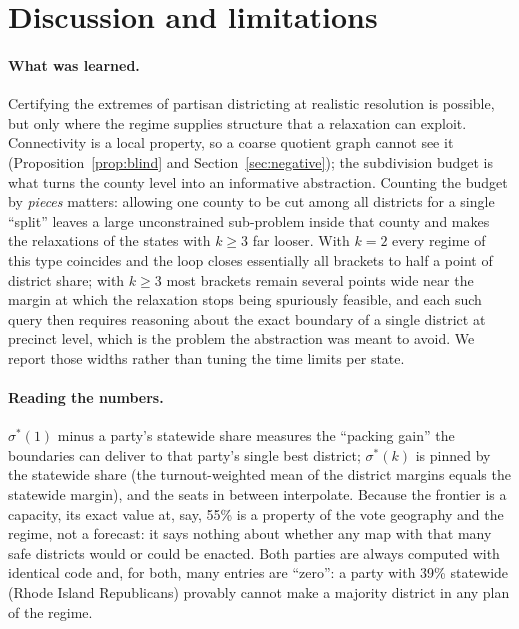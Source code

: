 \section{Discussion and limitations}\label{sec:disc}

\paragraph{What was learned.}
Certifying the extremes of partisan districting at realistic resolution is possible, but only where the regime supplies structure that a relaxation can exploit. Connectivity is a local property, so a coarse quotient graph cannot see it (Proposition~\ref{prop:blind} and Section~\ref{sec:negative}); the subdivision budget is what turns the county level into an informative abstraction. Counting the budget by \emph{pieces} matters: allowing one county to be cut among all districts for a single ``split'' leaves a large unconstrained sub-problem inside that county and makes the relaxations of the states with $k\ge3$ far looser. With $k=2$ every regime of this type coincides and the loop closes essentially all brackets to half a point of district share; with $k\ge3$ most brackets remain several points wide near the margin at which the relaxation stops being spuriously feasible, and each such query then requires reasoning about the exact boundary of a single district at precinct level, which is the problem the abstraction was meant to avoid. We report those widths rather than tuning the time limits per state.

\paragraph{Reading the numbers.}
$\sigma^*(1)$ minus a party's statewide share measures the ``packing gain'' the boundaries can deliver to that party's single best district; $\sigma^*(k)$ is pinned by the statewide share (the turnout-weighted mean of the district margins equals the statewide margin), and the seats in between interpolate. Because the frontier is a capacity, its exact value at, say, 55\% is a property of the vote geography and the regime, not a forecast: it says nothing about whether any map with that many safe districts would or could be enacted. Both parties are always computed with identical code and, for both, many entries are ``zero'': a party with 39\% statewide (Rhode Island Republicans) provably cannot make a majority district in any plan of the regime.

